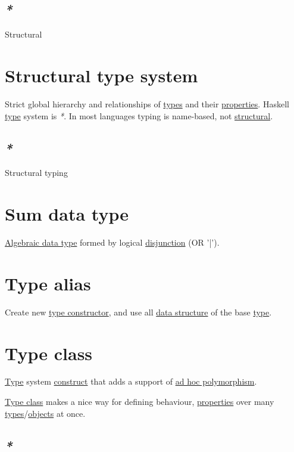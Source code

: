 \documentclass[a4paper,14pt,oneside]{book}
\begin{document}
\subsection{\emph{*}}
\label{sec:org83290b8}

\label{orgc5dec2b}Structural

\section{\label{org6e47b94}Structural type system}
\label{sec:orgb96ec86}
Strict global hierarchy and relationships of \hyperref[orge9a3a14]{types} and their \hyperref[orgff8ecf0]{properties}.
Haskell \hyperref[org1eff537]{type} system is \emph{*}.
In most languages typing is name-based, not \hyperref[orgc5dec2b]{structural}.

\subsection{\emph{*}}
\label{sec:org8b3d5a6}

\label{org8ff9a00}Structural typing

\section{\label{org99d41c4}Sum data type}
\label{sec:org0e4ca9f}
\hyperref[orgef9f436]{Algebraic data type} formed by logical \hyperref[orgd79d2fa]{disjunction} (OR '|').

\section{\label{org3b36c81}Type alias}
\label{sec:org8111051}
Create new \hyperref[org7b71390]{type constructor}, and use all \hyperref[org527bcbb]{data structure} of the base \hyperref[org1eff537]{type}.

\section{\label{org8cb2c3b}Type class}
\label{sec:org52511e8}
\hyperref[org1eff537]{Type} system \hyperref[org29d8bb0]{construct} that adds a support of \hyperref[org89f8640]{ad hoc polymorphism}.

\hyperref[org8cb2c3b]{Type class} makes a nice way for defining behaviour, \hyperref[orgff8ecf0]{properties} over many \hyperref[orge9a3a14]{types}/\hyperref[orgde02dc0]{objects} at once.

\subsection{\emph{*}}
\label{sec:org552c984}
\end{document}
